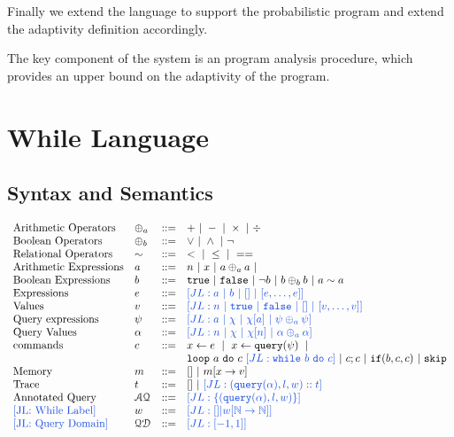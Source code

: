 \documentclass[a4paper,11pt]{article}
\begin{document}
Finally we extend the language to support the probabilistic program and extend the adaptivity definition accordingly.


The key component of the system is an program analysis procedure, which provides an upper bound on the adaptivity of the program.

\section{While Language}
%
\subsection{Syntax and Semantics}
%
\[
\begin{array}{llll}
 \mbox{Arithmetic Operators} & \oplus_a & ::= & + ~|~ - ~|~ \times 
%
~|~ \div \\  
  \mbox{Boolean Operators} & \oplus_b & ::= & \lor ~|~ \land ~|~ \neg\\
   \mbox{Relational Operators} & \sim & ::= & < ~|~ \leq ~|~ == \\  
\mbox{Arithmetic Expressions} & \aexpr & ::= & 
	n ~|~ x ~|~ \aexpr \oplus_a \aexpr ~|~ \\
\mbox{Boolean Expressions} & \bexpr & ::= & 
	\etrue ~|~ \efalse  ~|~ \neg \bexpr
	 ~|~ \bexpr \oplus_b \bexpr
	~|~ \aexpr \sim \aexpr \\
\mbox{Expressions } & \expr & ::= & \jl{\aexpr \sep \bexpr ~|~ [] ~|~ [\expr, \dots, \expr]} \\
\mbox{Values } & v & ::= & \jl{ n \sep \etrue \sep \efalse ~|~ [] ~|~ [v, \dots, v]}  
\\
\mbox{Query expressions} & \qexpr & ::= 
& \jl{ \aexpr ~|~ \chi ~|~ \chi[\aexpr] ~|~ \qexpr \oplus_a \qexpr} 
\\
\mbox{Query Values} & \qval & ::= 
& \jl{ n ~|~ \chi ~|~ \chi[n] ~|~ \qval \oplus_a  \qval }
\\
\mbox{commands} & c & ::= &   \assign x \expr ~|~  \assign{x}{ \query(\qexpr)}
%
~|~ \\ 
&&& \eloop ~ \aexpr  ~ \edo ~ c ~ \jl{\ewhile ~ b ~ \edo ~ c}  ~|~ c;c  ~|~ \eif(\bexpr, c, c) 	 ~|~ \eskip 
	\\
\mbox{Memory} & m & ::= & [] ~|~ m[x \to v] \\
\mbox{Trace} & t & ::= & [] 
~|~ \jl{{( \query(\qval), l, w) :: t}} \\
%
\mbox{Annotated Query} & \mathcal{AQ}  & 
::= & \jl{\{( \query(\qval), l, w) \} } 
\\
%
\mbox{\jl{While Label}}
& w & ::= & \jl{[] |  w[\mathbb{N} \to \mathbb{N}]}
\\
%
\mbox{\jl{Query Domain}}
& \qdom & ::= & \jl{[-1,1]}
\end{array}
\]
%
\end{document}
